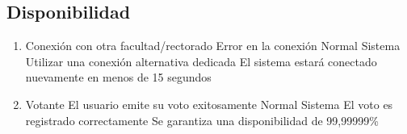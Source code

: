 \subsection{Disponibilidad}

\begin{enumerate}
 










\medskip
\item {}
{Conexi\'on con otra facultad/rectorado}
{Error en la conexi\'on}
{Normal}
{Sistema}
{Utilizar una conexi\'on alternativa dedicada}
{El sistema estar\'a conectado nuevamente en menos de 15 segundos}




\medskip
\item {}
{Votante}
{El usuario emite su voto exitosamente}
{Normal}
{Sistema}
{El voto es registrado correctamente}
{Se garantiza una disponibilidad de 99,99999\%}


\end{enumerate}

